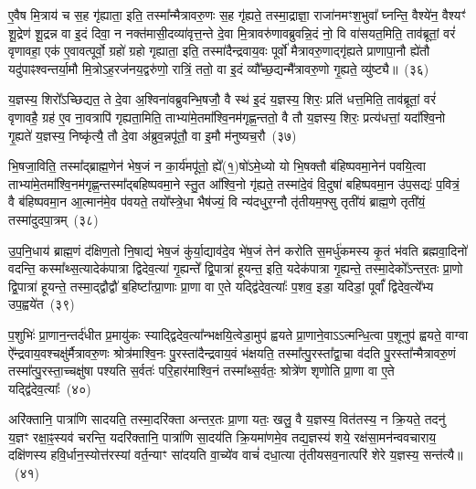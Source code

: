 ए॒वैष मि॒त्राय॑ च स॒ह गृ॑ह्याता॒ इति॒ तस्मा᳚न्मैत्रावरु॒णः स॒ह गृ॑ह्यते॒ तस्मा॒द्राज्ञा॒ राजा॑नमꣳश॒भुवा᳚ घ्नन्ति॒ वैश्ये॑न॒ वैश्यꣳ॑ शू॒द्रेण॑ शू॒द्रन्न वा इ॒दं दिवा॒ न नक्त॑मासी॒दव्या॑वृत्त॒न्ते दे॒वा मि॒त्रावरु॑णावब्रुवन्नि॒दं नो॒ वि वा॑सयत॒मिति॒ ताव॑ब्रूतां॒ वरं॑ वृणावहा॒ एक॑ ए॒वावत्पूर्वो॒ ग्रहो॑ ग्रहो गृह्याता॒ इति॒ तस्मा॑दैन्द्रवाय॒वः पूर्वो॑ मैत्रावरु॒णाद्गृ॑ह्यते प्राणापा॒नौ ह्ये॑तौ यदु॑पाꣴश्वन्तर्या॒मौ मि॒त्रो\-ऽह॒रज॑नय॒द्वरु॑णो॒ रात्रिं॒ ततो॒ वा इ॒दं व्यौ᳚च्छ॒द्यन्मै᳚त्रावरु॒णो गृ॒ह्यते॒ व्यु॑ष्ट्यै॥~(३६)\ip

{\anuvakamend[{ए॒ष चै᳚न्द्रवाय॒वो द्वाविꣳ॑शतिश्च}]}

य॒ज्ञस्य॒ शिरो᳚\-ऽच्छिद्यत॒ ते दे॒वा अ॒श्विना॑वब्रुवन्भि॒षजौ॒ वै स्थ॑ इ॒दं य॒ज्ञस्य॒ शिरः॒ प्रति॑ धत्त॒मिति॒ ताव॑ब्रूतां॒ वरं॑ वृणावहै॒ ग्रह॑ ए॒व ना॒वत्रापि॑ गृह्यता॒मिति॒ ताभ्या॑मे॒तमा᳚श्वि॒नम॑गृह्ण॒न्ततो॒ वै तौ य॒ज्ञस्य॒ शिरः॒ प्रत्य॑धत्तां॒ यदा᳚श्वि॒नो गृ॒ह्यते॑ य॒ज्ञस्य॒ निष्कृ॑त्यै॒ तौ दे॒वा अ॑ब्रुव॒न्नपू॑तौ॒ वा इ॒मौ म॑नुष्यच॒रौ~(३७)\ip

भि॒षजा॒विति॒ तस्मा᳚द्\-ब्राह्म॒णेन॑ भेष॒जं न का॒र्य॑मपू॑तो॒ ह्ये᳚(१॒)षो॑\-ऽमे॒ध्यो यो भि॒षक्तौ ब॑हिष्पवमा॒नेन॑ पवयि॒त्वा ताभ्या॑मे॒तमा᳚श्वि॒नम॑गृह्ण॒न्तस्मा᳚द्\-बहिष्पवमा॒ने स्तु॒त आ᳚श्वि॒नो गृ॑ह्यते॒ तस्मा॑दे॒वं वि॒दुषा॑ बहिष्पवमा॒न उ॑प॒सद्यः॑ प॒वित्रं॒ वै ब॑हिष्पवमा॒न आ॒त्मान॑मे॒व प॑वयते॒ तयो᳚स्त्रे॒धा भैष॑ज्यं॒ वि न्य॑दधुर॒ग्नौ तृ॑तीयम॒फ्सु तृती॑यं ब्राह्म॒णे तृती॑यं॒ तस्मा॑दुदपा॒त्रम्~(३८)\ip

उ॒प॒नि॒धाय॑ ब्राह्म॒णं द॑क्षिण॒तो नि॒षाद्य॑ भेष॒जं कु॑र्या॒द्याव॑दे॒व भे॑ष॒जं तेन॑ करोति स॒मर्धु॑कमस्य कृ॒तं भ॑वति ब्रह्मवा॒दिनो॑ वदन्ति॒ कस्मा᳚थ्स॒त्यादेक॑पात्रा द्विदेव॒त्या॑ गृ॒ह्यन्ते᳚ द्वि॒पात्रा॑ हूयन्त॒ इति॒ यदेक॑पात्रा गृ॒ह्यन्ते॒ तस्मा॒देको᳚\-ऽन्तर॒तः प्रा॒णो द्वि॒पात्रा॑ हूयन्ते॒ तस्मा॒द्द्वौद्वौ॑ ब॒हिष्टा᳚त्प्रा॒णाः प्रा॒णा वा ए॒ते यद्द्वि॑देव॒त्याः᳚ प॒शव॒ इडा॒ यदिडां॒ पूर्वां᳚ द्विदेव॒त्ये᳚भ्य उप॒ह्वये॑त~(३९)\ip

प॒शुभिः॑ प्रा॒णान॒न्तर्द॑धीत प्र॒मायु॑कः स्याद्द्विदेव॒त्या᳚न्भक्षयि॒त्वेडा॒मुप॑ ह्वयते प्रा॒णाने॒वा\-ऽऽ\-त्मन्धि॒त्वा प॒शूनुप॑ ह्वयते॒ वाग्वा ऐ᳚न्द्रवाय॒वश्चक्षु॑र्मैत्रावरु॒णः श्रोत्र॑माश्वि॒नः पु॒रस्ता॑दैन्द्रवाय॒वं भ॑क्षयति॒ तस्मा᳚त्पु॒रस्ता᳚द्वा॒चा व॑दति पु॒रस्ता᳚न्मैत्रावरु॒णं तस्मा᳚त्पु॒रस्ता॒च्चक्षु॑षा पश्यति स॒र्वतः॑ परि॒हार॑माश्वि॒नं तस्मा᳚थ्स॒र्वतः॒ श्रोत्रे॑ण शृणोति प्रा॒णा वा ए॒ते यद्द्वि॑देव॒त्याः᳚~(४०)\ip

अरि॑क्तानि॒ पात्रा॑णि सादयति॒ तस्मा॒दरि॑क्ता अन्तर॒तः प्रा॒णा यतः॒ खलु॒ वै य॒ज्ञस्य॒ वित॑तस्य॒ न क्रि॒यते॒ तदनु॑ य॒ज्ञꣳ रक्षा॒ꣴ॒स्यव॑ चरन्ति॒ यदरि॑क्तानि॒ पात्रा॑णि सा॒दय॑ति क्रि॒यमा॑णमे॒व तद्य॒ज्ञस्य॑ शये॒ रक्ष॑सा॒मन॑न्ववचाराय॒ दक्षि॑णस्य हवि॒र्धान॒स्योत्त॑रस्यां वर्त॒न्याꣳ सा॑दयति वा॒च्ये॑व वाचं॑ दधा॒त्या तृ॑तीय\-सव॒नात्परि॑ शेरे य॒ज्ञस्य॒ सन्त॑त्यै॥~(४१)\ip

